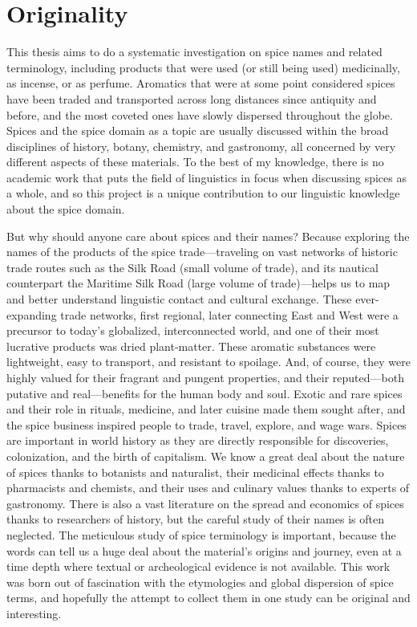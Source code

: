 \section{Originality}

This thesis aims to do a systematic investigation on spice names and related terminology, including products that were used (or still being used) medicinally, as incense, or as perfume. Aromatics that were at some point considered spices have been traded and transported across long distances since antiquity and before, and the most coveted ones have slowly dispersed throughout the globe. Spices and the spice domain as a topic are usually discussed within the broad disciplines of history, botany, chemistry, and gastronomy, all concerned by very different aspects of these materials. To the best of my knowledge, there is no academic work that puts the field of linguistics in focus when discussing spices as a whole, and so this project is a unique contribution to our linguistic knowledge about the spice domain.

But why should anyone care about spices and their names? Because exploring the names of the products of the spice trade---traveling on vast networks of historic trade routes such as the Silk Road (small volume of trade), and its nautical counterpart the Maritime Silk Road (large volume of trade)---helps us to map and better understand linguistic contact and cultural exchange. These ever-expanding trade networks, first regional, later connecting East and West were a precursor to today's globalized, interconnected world, and one of their most lucrative products was dried plant-matter. These aromatic substances were lightweight, easy to transport, and resistant to spoilage. And, of course, they were highly valued for their fragrant and pungent properties, and their reputed---both putative and real---benefits for the human body and soul. Exotic and rare spices and their role in rituals, medicine, and later cuisine made them sought after, and the spice business inspired people to trade, travel, explore, and wage wars. Spices are important in world history as they are directly responsible for discoveries, colonization, and the birth of capitalism. We know a great deal about the nature of spices thanks to botanists and naturalist, their medicinal effects thanks to pharmacists and chemists, and their uses and culinary values thanks to experts of gastronomy. There is also a vast literature on the spread and economics of spices thanks to researchers of history, but the careful study of their names is often neglected. The meticulous study of spice terminology is important, because the words can tell us a huge deal about the material's origins and journey, even at a time depth where textual or archeological evidence is not available. This work was born out of fascination with the etymologies and global dispersion of spice terms, and hopefully the attempt to collect them in one study can be original and interesting.

